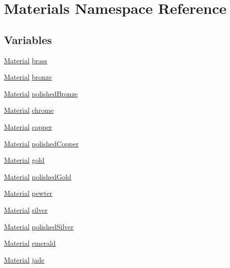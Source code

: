 \hypertarget{namespace_materials}{}\section{Materials Namespace Reference}
\label{namespace_materials}
\subsection*{Variables}
\begin{DoxyCompactItemize}
\item 
\hyperlink{struct_material}{Material} \hyperlink{namespace_materials_adb662ea7a8869f3cba2dcf125ac0d902}{brass}
\item 
\hyperlink{struct_material}{Material} \hyperlink{namespace_materials_aef75c359633b069fb948443f8011afb1}{bronze}
\item 
\hyperlink{struct_material}{Material} \hyperlink{namespace_materials_a74ca93b9b8f4b91eac56e29dcf2f4fb4}{polished\+Bronze}
\item 
\hyperlink{struct_material}{Material} \hyperlink{namespace_materials_ae1d90d5c8c231d887fd22e459a4632ca}{chrome}
\item 
\hyperlink{struct_material}{Material} \hyperlink{namespace_materials_a00e102c39a09ca4fd6932f43094af174}{copper}
\item 
\hyperlink{struct_material}{Material} \hyperlink{namespace_materials_a2140516cc8e291d497ac00dbd73d8fbd}{polished\+Copper}
\item 
\hyperlink{struct_material}{Material} \hyperlink{namespace_materials_aaa1f200530d72d7ee11f5fc492f82bf9}{gold}
\item 
\hyperlink{struct_material}{Material} \hyperlink{namespace_materials_a714fa575786b960faa0e02dac82a4435}{polished\+Gold}
\item 
\hyperlink{struct_material}{Material} \hyperlink{namespace_materials_a125b4c95ab2ef64d802378762572abea}{pewter}
\item 
\hyperlink{struct_material}{Material} \hyperlink{namespace_materials_a566238bc6d1fe2f5e8a78e2031b8eb09}{silver}
\item 
\hyperlink{struct_material}{Material} \hyperlink{namespace_materials_aca88f7adaadc3a3bbfce3dea0c276451}{polished\+Silver}
\item 
\hyperlink{struct_material}{Material} \hyperlink{namespace_materials_af0d20fbbd84514c88dc37f22beb5ff8e}{emerald}
\item 
\hyperlink{struct_material}{Material} \hyperlink{namespace_materials_a5fc7c043507c2cea752070b593ca85aa}{jade}

\end{DoxyCompactItemize}
